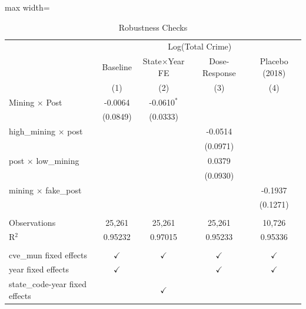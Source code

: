 
\begin{table}[htbp]
   \caption{\label{tab:robustness} Robustness Checks}
   \bigskip
   \centering
   \begin{adjustbox}{max width=\textwidth}
   \begin{tabular}{lcccc}
      \toprule
       & \multicolumn{4}{c}{Log(Total Crime)}\\
                                      & Baseline      & State$\times$Year FE  & Dose-Response & Placebo (2018) \\   
                                      & (1)           & (2)                   & (3)           & (4)\\  
      \midrule 
      Mining $\times$ Post            & -0.0064       & -0.0610$^{*}$         &               &   \\   
                                      & (0.0849)      & (0.0333)              &               &   \\   
      high\_mining $\times$ post      &               &                       & -0.0514       &   \\   
                                      &               &                       & (0.0971)      &   \\   
      post $\times$ low\_mining       &               &                       & 0.0379        &   \\   
                                      &               &                       & (0.0930)      &   \\   
      mining $\times$ fake\_post      &               &                       &               & -0.1937\\   
                                      &               &                       &               & (0.1271)\\   
       \\
      Observations                    & 25,261        & 25,261                & 25,261        & 10,726\\  
      R$^2$                           & 0.95232       & 0.97015               & 0.95233       & 0.95336\\  
       \\
      cve\_mun fixed effects          & $\checkmark$  & $\checkmark$          & $\checkmark$  & $\checkmark$\\   
      year fixed effects              & $\checkmark$  &                       & $\checkmark$  & $\checkmark$\\   
      state\_code-year fixed effects  &               & $\checkmark$          &               & \\  
      \bottomrule
   \end{tabular}
   \end{adjustbox}


\end{table}

